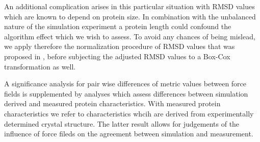 \documentclass{article}\usepackage[table]{xcolor}
\renewcommand{\$}{$} %
\begin{document}
An additional complication arises in this particular situation with
RMSD values which are known to depend on protein size. In combination
with the unbalanced nature of the simulation experiment a protein
length could confound the algorithm effect which we wish to assess. To
avoid any chances of being mislead, we apply therefore the
normalization procedure of RMSD values that was proposed in
\cite{Carugo+Pongor:2001}, before subjecting the adjusted RMSD values
to a Box-Cox transformation as well. 

A significance analysis for pair wise differences of metric values
between force fields is supplemented by analyses which assess
differences between simulation derived and measured protein
characteristics. With measured protein characteristics we refer to
characteristics whcih are derived from experimentally determined
crystal structure. The latter result allows for judgements of the
influence of force fileds on the agreement between simulation and
measurement.
\end{document}
